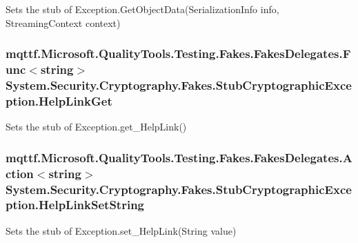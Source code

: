 Sets the stub of Exception.\-Get\-Object\-Data(\-Serialization\-Info info, Streaming\-Context context)

\hypertarget{class_system_1_1_security_1_1_cryptography_1_1_fakes_1_1_stub_cryptographic_exception_a5eac4ef2f1a7ea11e93a479bd3a409db}{
\subsubsection[{Help\-Link\-Get}]{\setlength{\rightskip}{0pt plus 5cm}mqttf.\-Microsoft.\-Quality\-Tools.\-Testing.\-Fakes.\-Fakes\-Delegates.\-Func$<$string$>$ System.\-Security.\-Cryptography.\-Fakes.\-Stub\-Cryptographic\-Exception.\-Help\-Link\-Get}}\label{class_system_1_1_security_1_1_cryptography_1_1_fakes_1_1_stub_cryptographic_exception_a5eac4ef2f1a7ea11e93a479bd3a409db}


Sets the stub of Exception.\-get\-\_\-\-Help\-Link()

\hypertarget{class_system_1_1_security_1_1_cryptography_1_1_fakes_1_1_stub_cryptographic_exception_ad52e2b272bb812a7d856250cdea683e2}{
\subsubsection[{Help\-Link\-Set\-String}]{\setlength{\rightskip}{0pt plus 5cm}mqttf.\-Microsoft.\-Quality\-Tools.\-Testing.\-Fakes.\-Fakes\-Delegates.\-Action$<$string$>$ System.\-Security.\-Cryptography.\-Fakes.\-Stub\-Cryptographic\-Exception.\-Help\-Link\-Set\-String}}\label{class_system_1_1_security_1_1_cryptography_1_1_fakes_1_1_stub_cryptographic_exception_ad52e2b272bb812a7d856250cdea683e2}


Sets the stub of Exception.\-set\-\_\-\-Help\-Link(\-String value)


